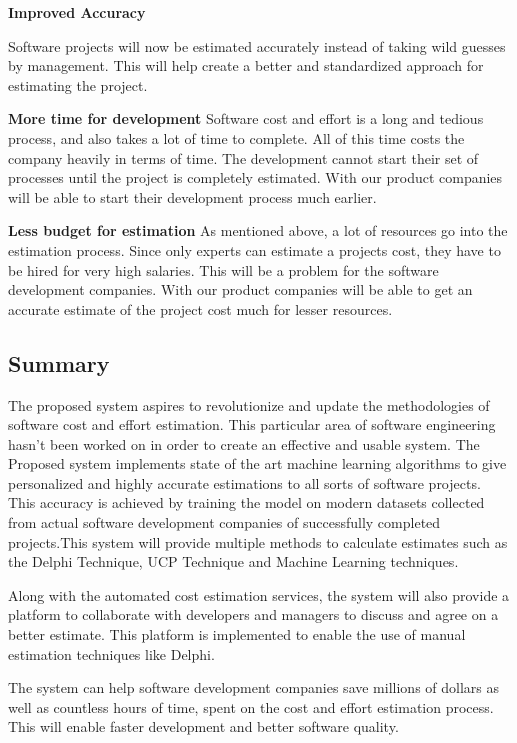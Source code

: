 \textbf{Improved Accuracy}

Software projects will now be estimated accurately instead of taking wild guesses by management. This will help create a better and standardized approach for estimating the project.\\
\vspace{0mm}

\textbf{More time for development}
Software cost and effort is a long and tedious process, and also takes a lot of time to complete. All of this time costs the company heavily in terms of time. The development cannot start their set of processes until the project is completely estimated. With our product companies will be able to start their development process much earlier.\\
\vspace{0mm}

\textbf{Less budget for estimation}
As mentioned above, a lot of resources go into the estimation process. Since only experts can estimate a projects cost, they have to be hired for very high salaries. This will be a problem for the software development companies. With our product companies will be able to get an accurate estimate of the project cost much for lesser resources.





\subsection{Summary}


\hspace{5mm}The proposed system aspires to revolutionize and update the methodologies of software cost and effort estimation. This particular area of software engineering hasn't been worked on in order to create an effective and usable system. The Proposed system implements state of the art machine learning algorithms to give personalized and highly accurate estimations to all sorts of software projects. This accuracy is achieved by training the model on modern datasets collected from actual software development companies of successfully completed projects.This system will provide multiple methods to calculate estimates such as the Delphi Technique, UCP Technique and Machine Learning techniques.

\vspace{2mm}
Along with the automated cost estimation services, the system will also provide a platform to collaborate with developers and managers to discuss and agree on a better estimate. This platform is implemented to enable the use of manual estimation techniques like Delphi. 

\vspace{2mm}
The system can help software development companies save millions of dollars as well as countless hours of time, spent on the cost  and effort estimation process. This will enable faster development and better software quality. 




